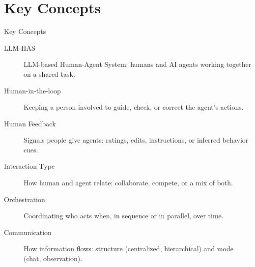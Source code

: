 \documentclass[10pt]{beamer}
\begin{document}
\section{Key Concepts}
\begin{frame}[allowframebreaks]{Key Concepts}
  \begin{description}
    \item[LLM-HAS] LLM-based Human-Agent System: humans and AI agents working together on a shared task.
    \item[Human-in-the-loop] Keeping a person involved to guide, check, or correct the agent's actions.
    \item[Human Feedback] Signals people give agents: ratings, edits, instructions, or inferred behavior cues.
    \item[Interaction Type] How human and agent relate: collaborate, compete, or a mix of both.
    \item[Orchestration] Coordinating who acts when, in sequence or in parallel, over time.
    \item[Communication] How information flows: structure (centralized, hierarchical) and mode (chat, observation).
  \end{description}
\end{frame}
\end{document}
